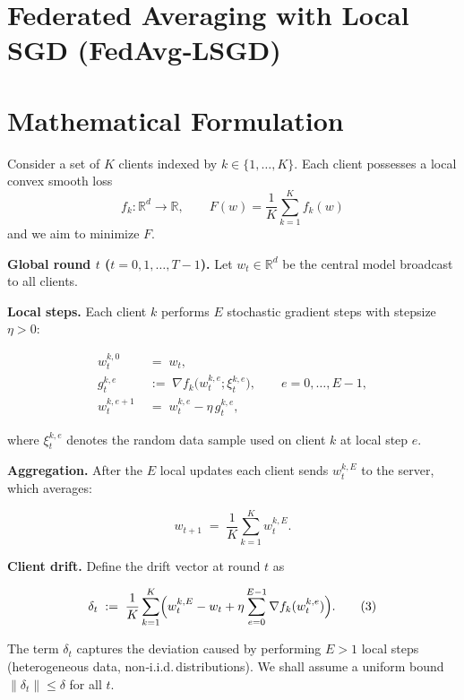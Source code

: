 \documentclass{article}
\newcommand{\R}{\mathbb{R}}
\begin{document}
\section*{Federated Averaging with Local SGD (FedAvg‑LSGD)}

\section*{Mathematical Formulation}
Consider a set of $K$ clients indexed by $k\in\{1,\dots,K\}$.  
Each client possesses a local convex smooth loss 
\[
f_k:\R^d\rightarrow\R ,\qquad 
F(w)=\frac1K\sum_{k=1}^K f_k(w)
\]
and we aim to minimize $F$.

\medskip
\noindent\textbf{Global round $t$ ($t=0,1,\dots,T-1$).}  
Let $w_t\in\R^d$ be the central model broadcast to all clients.

\medskip
\noindent\textbf{Local steps.}  
Each client $k$ performs $E$ stochastic gradient steps with stepsize $\eta>0$:

\[
\begin{aligned}
w_{t}^{k,0} &\;=\; w_t,\\[4pt]
g_{t}^{k,e} &\;:=\; \nabla f_k\!\bigl(w_{t}^{k,e};\xi_{t}^{k,e}\bigr),\qquad e=0,\dots,E-1,\\[4pt]
w_{t}^{k,e+1} &\;=\; w_{t}^{k,e} - \eta\, g_{t}^{k,e},
\end{aligned}
\tag{1}
\]

where $\xi_{t}^{k,e}$ denotes the random data sample used on client $k$ at local step $e$.

\medskip
\noindent\textbf{Aggregation.}  
After the $E$ local updates each client sends $w_{t}^{k,E}$ to the server, which averages:

\[
w_{t+1}\;=\;\frac1K\sum_{k=1}^K w_{t}^{k,E}.
\tag{2}
\]

\medskip
\noindent\textbf{Client drift.}  
Define the drift vector at round $t$ as

\[
\delta_t \;:=\; \frac1K \sum_{k=1}^K\Bigl(w_{t}^{k,E}- w_t + \eta\sum_{e=0}^{E-1}\nabla f_k(w_{t}^{k,e})\Bigr).
\tag{3}
\]

The term $\delta_t$ captures the deviation caused by performing $E>1$ local steps (heterogeneous data, non‑i.i.d.\,distributions).  
We shall assume a uniform bound $\|\delta_t\|\le \delta$ for all $t$.

\end{document}
